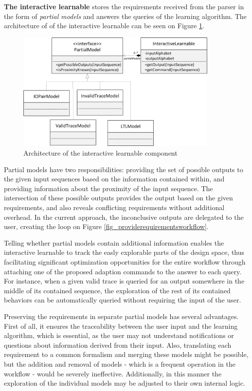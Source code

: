 \textbf{The interactive learnable} stores the requirements received from the parser in the form of \textit{partial models} and answers the queries of the learning algorithm. The architecture of of the interactive learnable can be seen on Figure \ref{fig_architcture_interactivelearnable}.

\begin{figure}[!ht] 
	\centering
	\includegraphics[width=100mm, keepaspectratio]{figures/architecture_interactivelearnable.png}
	\caption{Architecture of the interactive learnable component} 
	\label{fig_architcture_interactivelearnable}
\end{figure}

Partial models have two responsibilities: providing the set of possible outputs to the given input sequences based on the information contained within, and providing information about the proximity of the input sequence. The intersection of these possible outputs provides the output based on the given requirements, and also reveals conflicting requirements without additional overhead. In the current approach, the inconclusive outputs are delegated to the user, creating the loop on Figure \ref{fig_providerequirementsworkflow}.

Telling whether partial models contain additional information enables the interactive learnable to track the easly explorable parts of the design space, thus facilitating significant optimization opportunities for the entire workflow through attaching one of the proposed adaption commands to the answer to each query. For instance, when a given valid trace is queried for an output somewhere in the middle of its contained sequence, the exploration of the rest of its contained behaviors can be automatically queried without requiring the input of the user. 

Preserving the requirements in separate partial models has several advantages. First of all, it ensures the traceability between the user input and the learning algorithm, which is essential, as the user may not understand notifications or questions about information derived from their input. Also, translating each requirement to a common formalism and merging these models might be possible, but the addition and removal of models - which is a frequent operation in the workflow - would be severely ineffective. Additionally, in this manner the exploration of the individual models may be adjusted to their own internal logic.

